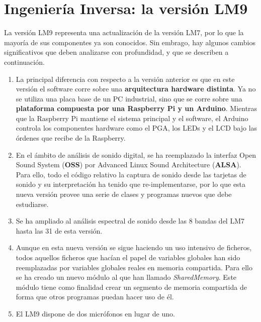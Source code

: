 \chapter{Ingeniería Inversa: la versión LM9} \label{cap:capitulo3_III}

La versión LM9 representa una actualización de la versión LM7, por lo que la mayoría de sus componentes ya son conocidos. Sin embrago, hay algunos cambios significativos que deben analizarse con profundidad, y que se describen a continuación.

\begin{enumerate}
	\item La principal diferencia con respecto a la versión anterior es que en este versión el software corre sobre una \textbf{arquitectura hardware distinta}. Ya no se utiliza una placa base de un PC industrial, sino que se corre sobre una \textbf{plataforma compuesta por una Raspberry Pi y un Arduino}. Mientras que la Raspberry Pi mantiene el sistema principal y el software, el Arduino controla los componentes hardware como el PGA, los LEDs y el LCD bajo las órdenes que recibe de la Raspberry.

	\item En el ámbito de análisis de sonido digital, se ha reemplazado la interfaz Open Sound System (\textbf{OSS}) por Advanced Linux Sound Architecture (\textbf{ALSA}). Para ello, todo el código relativo la captura de sonido desde las tarjetas de sonido y su interpretación ha tenido que re-implementarse, por lo que esta nueva versión provee una serie de clases y programas nuevos que debe estudiarse.

	\item Se ha ampliado al análisis espectral de sonido desde las 8 bandas del LM7 hasta las 31 de esta versión.

	\item Aunque en esta nueva versión se sigue haciendo un uso intensivo de ficheros, todos aquellos ficheros que hacían el papel de variables globales han sido reemplazadas por variables globales reales en memoria compartida. Para ello se ha creado un nuevo módulo al que han llamado \textit{SharedMemory}. Este módulo tiene como finalidad crear un segmento de memoria compartida de forma que otros programas puedan hacer uso de él.

	\item El LM9 dispone de dos micrófonos en lugar de uno.
\end{enumerate}

